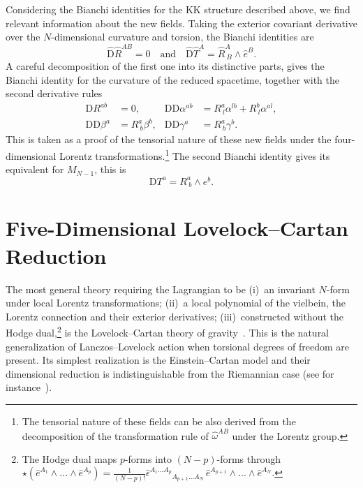 \documentclass[aps,prd,12pt,superscriptaddress,showpacs,showkeys,longbibliography,reprint,nofootinbib]{revtex4-1}
\begin{document}
Considering the Bianchi identities for the KK structure described above, we find relevant information about the new fields. Taking the exterior covariant derivative over the $N$-dimensional curvature and torsion, the Bianchi identities are
\begin{equation}
  \hat{\text{D}}\hat{R}^{AB} = 0 \quad \text{and} \quad \hat{\text{D}}\hat{T}^A = \hat{R}^A_{\ B}\wedge\hat{e}^B.
\end{equation}
A careful decomposition of the first one into its distinctive parts, gives the Bianchi identity for the curvature of the reduced spacetime, together with the second derivative rules
\begin{equation}
  \begin{aligned}
    \text{D}R^{ab} &=0, & \text{D}\mbox{D}\alpha^{ab} &=R^a_{\ l}\alpha^{lb}+R^b_{\ l}\alpha^{al},\\
    \text{D}\text{D}\beta^a &= R^a_{\ b}\beta^{b}, & \text{D}\text{D}\gamma^a &= R^a_{\ b}\gamma^{b}.
  \end{aligned}
\end{equation}
This is taken as a proof of the tensorial nature of these new fields under the four-dimensional Lorentz transformations.\footnote{The tensorial nature of these fields can be also derived from the decomposition of the transformation rule of $\hat{\omega}^{AB}$ under the Lorentz group.} The second Bianchi identity gives its equivalent for $M_{N-1}$, this is
\begin{equation*}
  \mbox{D}T^a=R^a_{\ b}\wedge e^b.
\end{equation*}


\section{Five-Dimensional Lovelock--Cartan Reduction\label{5EGB}}

The most general theory requiring the Lagrangian to be (i)~an invariant $N$-form under local Lorentz transformations; (ii)~a local polynomial of the vielbein, the Lorentz connection and their exterior derivatives; (iii)~constructed without the Hodge dual,\footnote{The Hodge dual maps $p$-forms into $(N-p)$-forms through $\star\left(\hat{e}^{A_1}\wedge ... \wedge\hat{e}^{A_p}\right) = \frac{1}{(N-p)!}\hat{\epsilon}^{A_1\ldots A_p}{}_{A_{p+1}...A_N}\,\hat{e}^{A_{p+1}}\wedge ... \wedge\hat{e}^{A_N}$.} is the Lovelock--Cartan theory of gravity~\cite{Mardones:1990qc}. This is the natural generalization of Lanczos--Lovelock action when torsional degrees of freedom are present. Its simplest realization is the Einstein--Cartan model and their dimensional reduction is indistinguishable from the Riemannian case (see for instance~\cite{German:1993bq,Aros:2007nn}). 
\end{document}
